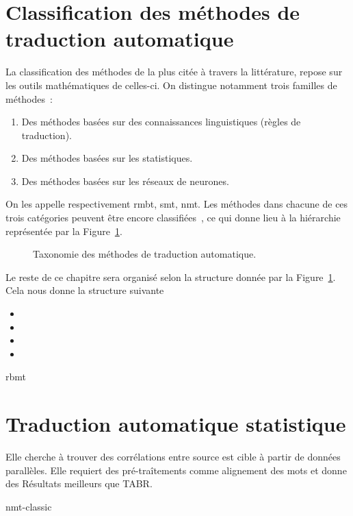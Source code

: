 \section{Classification des méthodes de traduction automatique}

La classification des méthodes de  la plus citée à travers la littérature, 
repose sur les outils mathématiques de celles-ci.
On distingue notamment trois familles de méthodes~\cite{deep-nmt-survey}:
\begin{enumerate}
    \item Des méthodes basées sur des connaissances linguistiques (règles de traduction).
    \item Des méthodes basées sur les statistiques.
    \item Des méthodes basées sur les réseaux de neurones.
\end{enumerate}

On les appelle respectivement \Acrfull{rmbt}, \Acrfull{smt}, \Acrfull{nmt}.
Les méthodes dans chacune de ces trois catégories peuvent être encore classifiées~\cite{deep-nmt-survey,hybrid-mt},
ce qui donne lieu à la hiérarchie représentée par la Figure~\ref{fig:mt-taxonomy-tree}.

\begin{figure}
    \begin{center}
       \resizebox{\textwidth}{!}{
         
       }
    \end{center}
    
    \caption{Taxonomie des méthodes de traduction automatique.}
    \label{fig:mt-taxonomy-tree}
\end{figure}

Le reste de ce chapitre sera organisé selon la structure donnée par la Figure~\ref{fig:mt-taxonomy-tree}. 
Cela nous donne la structure suivante

\begin{itemize}
    \item {}
    \item {}
    \item {}
    \item {}
\end{itemize}

{rbmt}
\section{Traduction automatique statistique}

Elle cherche à trouver des corrélations entre source est cible à partir de données parallèles.
Elle requiert des pré-traîtements comme alignement des mots et donne des Résultats meilleurs que TABR.


\label{sec:smt}
{nmt-classic}

